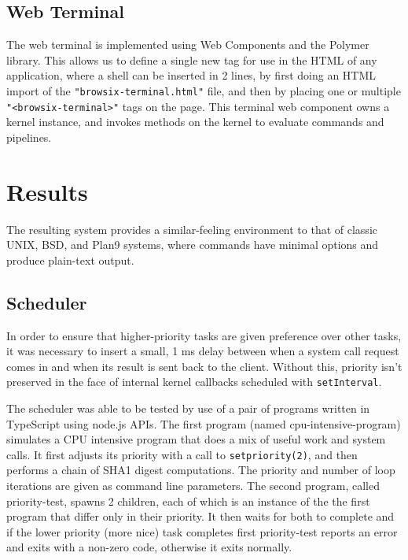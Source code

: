 \documentclass{acm_proc_article-sp}
\begin{document}
\subsection{Web Terminal}

The web terminal is implemented using Web Components and the Polymer
library.  This allows us to define a single new tag for use in the
HTML of any application, where a shell can be inserted in 2 lines, by
first doing an HTML import of the \texttt{"browsix-terminal.html"}
file, and then by placing one or multiple
\texttt{"<browsix-terminal>"} tags on the page.  This terminal web
component owns a kernel instance, and invokes methods on the kernel to
evaluate commands and pipelines.

\section{Results}

The resulting system provides a similar-feeling environment to that of
classic UNIX, BSD, and Plan9 systems, where commands have minimal
options and produce plain-text output.

\subsection{Scheduler}

In order to ensure that higher-priority tasks are given preference
over other tasks, it was necessary to insert a small, 1 ms delay
between when a system call request comes in and when its result is
sent back to the client.  Without this, priority isn't preserved in
the face of internal kernel callbacks scheduled with
\texttt{setInterval}.

The scheduler was able to be tested by use of a pair of programs
written in TypeScript using node.js APIs.  The first program (named
cpu-intensive-program) simulates a CPU intensive program that does a
mix of useful work and system calls.  It first adjusts its priority
with a call to \texttt{setpriority(2)}, and then performs a chain of
SHA1 digest computations.  The priority and number of loop iterations
are given as command line parameters.  The second program, called
priority-test, spawns 2 children, each of which is an instance of the
the first program that differ only in their priority.  It then waits
for both to complete and if the lower priority (more nice) task
completes first priority-test reports an error and exits with a
non-zero code, otherwise it exits normally.
\end{document}
